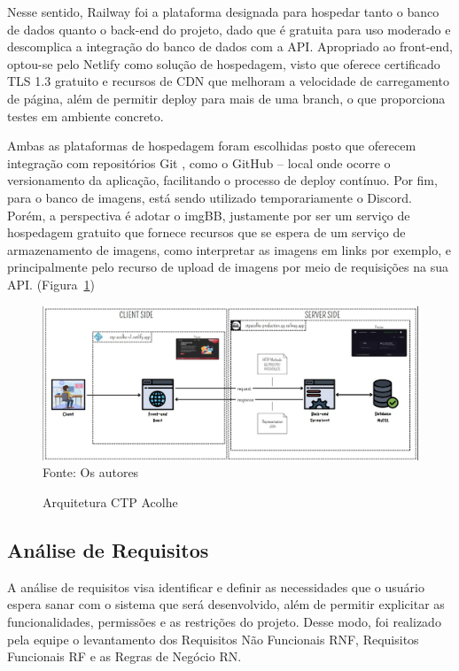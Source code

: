 \documentclass[12pt,a4paper]{article}
\begin{document}
Nesse sentido, \gls{Railway} foi a plataforma designada para hospedar tanto o banco de dados quanto o back-end do projeto, dado que é gratuita para uso moderado e descomplica a integração do banco de dados com a \gls{API}.
Apropriado ao front-end, optou-se pelo \gls{Netlify} \cite{netlify} como solução de hospedagem, visto que oferece certificado \gls{TLS} 1.3 \cite{tls} gratuito e recursos de \gls{CDN} \cite{cdn} que melhoram a velocidade de carregamento de página, além de permitir deploy para mais de uma branch, o que proporciona testes em ambiente concreto.

Ambas as plataformas de hospedagem foram escolhidas posto que oferecem integração com repositórios \gls{Git} \cite{git}, como o \gls{GitHub} \cite{gith} – local onde ocorre o versionamento da aplicação, facilitando o processo de deploy contínuo. 
Por fim, para o banco de imagens, está sendo utilizado temporariamente o \gls{Discord}. Porém, a perspectiva é adotar o \gls{imgBB}, justamente por ser um serviço de hospedagem gratuito que fornece recursos que se espera de um serviço de armazenamento de imagens, como interpretar as imagens em links por exemplo, e principalmente pelo recurso de upload de imagens por meio de requisições na sua \gls{API}. \cite{arquitetura} (Figura~\ref{aqr}) 

\begin{figure}[H]
    \centering
    \caption{Arquitetura CTP Acolhe}
     \includegraphics[width=15cm]{aqr.jpg} \\
    Fonte: Os autores
    \label{aqr}
\end{figure}

\newpage

\subsection{Análise de Requisitos}
A análise de requisitos visa identificar e definir as necessidades que o usuário espera sanar com o sistema que será desenvolvido, além de permitir explicitar as funcionalidades, permissões e as restrições do projeto. Desse modo, foi realizado pela equipe o levantamento dos Requisitos Não Funcionais \ac{RNF}, Requisitos Funcionais \ac{RF} e as Regras de Negócio \ac{RN}. \cite{vverner, mestres, artigoo} 
\end{document}
